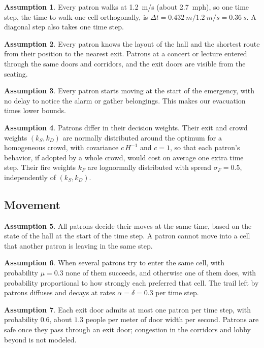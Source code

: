 \documentclass[14pt]{article}
\theoremstyle{definition}
\newtheorem{assumption}{Assumption}
\begin{document}
\begin{assumption}\label{as:pathfinding}
  Every patron walks at \SI{1.2}{m/s} (about \SI{2.7}{mph}), so one time step, the time to walk one cell orthogonally, is $\Delta t = \SI{0.432}{m} / \SI{1.2}{m/s} = \SI{0.36}{s}$. A diagonal step also takes one time step.
\end{assumption}
\begin{assumption}\label{as:knowledge}
  Every patron knows the layout of the hall and the shortest route from their position to the nearest exit. Patrons at a concert or lecture entered through the same doors and corridors, and the exit doors are visible from the seating.
\end{assumption}
\begin{assumption}\label{as:start}
  Every patron starts moving at the start of the emergency, with no delay to notice the alarm or gather belongings. This makes our evacuation times lower bounds.
\end{assumption}
\begin{assumption}\label{as:population}
  Patrons differ in their decision weights. Their exit and crowd weights $(k_S, k_D)$ are normally distributed around the optimum for a homogeneous crowd, with covariance $c\,H^{-1}$ and $c = 1$, so that each patron's behavior, if adopted by a whole crowd, would cost on average one extra time step. Their fire weights $k_F$ are lognormally distributed with spread $\sigma_F = 0.5$, independently of $(k_S, k_D)$.
\end{assumption}

\subsection{Movement}
\begin{assumption}\label{as:parallel}
  All patrons decide their moves at the same time, based on the state of the hall at the start of the time step. A patron cannot move into a cell that another patron is leaving in the same step.
\end{assumption}
\begin{assumption}\label{as:friction}
  When several patrons try to enter the same cell, with probability $\mu = 0.3$ none of them succeeds, and otherwise one of them does, with probability proportional to how strongly each preferred that cell. The trail left by patrons diffuses and decays at rates $\alpha = \delta = 0.3$ per time step.
\end{assumption}
\begin{assumption}\label{as:doors}
  Each exit door admits at most one patron per time step, with probability $0.6$, about $1.3$ people per meter of door width per second. Patrons are safe once they pass through an exit door; congestion in the corridors and lobby beyond is not modeled.
\end{assumption}
\end{document}

